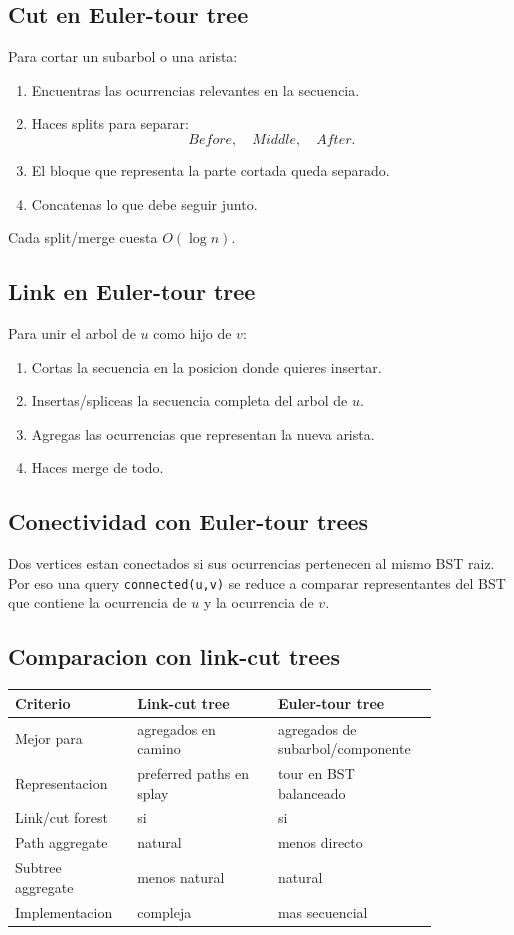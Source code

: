 \documentclass[10pt]{article}
\newcommand{\bigO}{O}
\begin{document}
\subsection{Cut en Euler-tour tree}
Para cortar un subarbol o una arista:
\begin{enumerate}[leftmargin=*]
\item Encuentras las ocurrencias relevantes en la secuencia.
\item Haces splits para separar:
\[
Before,\quad Middle,\quad After.
\]
\item El bloque que representa la parte cortada queda separado.
\item Concatenas lo que debe seguir junto.
\end{enumerate}
Cada split/merge cuesta $\bigO(\log n)$.

\subsection{Link en Euler-tour tree}
Para unir el arbol de $u$ como hijo de $v$:
\begin{enumerate}[leftmargin=*]
\item Cortas la secuencia en la posicion donde quieres insertar.
\item Insertas/spliceas la secuencia completa del arbol de $u$.
\item Agregas las ocurrencias que representan la nueva arista.
\item Haces merge de todo.
\end{enumerate}

\subsection{Conectividad con Euler-tour trees}
Dos vertices estan conectados si sus ocurrencias pertenecen al mismo BST raiz.
Por eso una query \texttt{connected(u,v)} se reduce a comparar representantes
del BST que contiene la ocurrencia de $u$ y la ocurrencia de $v$.

\subsection{Comparacion con link-cut trees}
\begin{center}
\begin{tabular}{p{0.24\linewidth}p{0.30\linewidth}p{0.30\linewidth}}
\toprule
Criterio & Link-cut tree & Euler-tour tree \\
\midrule
Mejor para & agregados en camino & agregados de subarbol/componente \\
Representacion & preferred paths en splay & tour en BST balanceado \\
Link/cut forest & si & si \\
Path aggregate & natural & menos directo \\
Subtree aggregate & menos natural & natural \\
Implementacion & compleja & mas secuencial \\
\bottomrule
\end{tabular}
\end{center}
\end{document}
